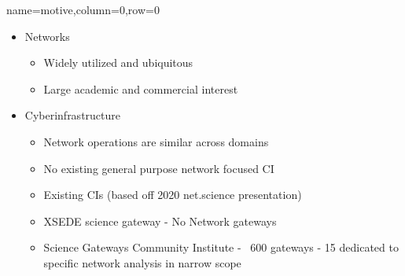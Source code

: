\documentclass[landscape,paperwidth=70in,paperheight=46in,fontscale=0.225]{baposter} %
\begin{document}
\begin{poster}
            

\vspace{-2.5in} %


          {name=motive,column=0,row=0}{
       
\begin{itemize}[leftmargin=*,noitemsep,topsep=0pt]
\item Networks
	\begin{itemize}
	\item Widely utilized and ubiquitous
	\item Large academic and commercial interest
	\end{itemize}

\item Cyberinfrastructure
	\begin{itemize}
	\item Network operations are similar across domains
	\item No existing general purpose network focused CI
	\item Existing CIs (based off 2020 net.science presentation)
	\item XSEDE science gateway - No Network gateways
	\item Science Gateways Community Institute - ~600 gateways - 15 dedicated to specific network analysis in narrow scope
	\end{itemize}
\end{itemize}

}
\end{poster}
\end{document}
